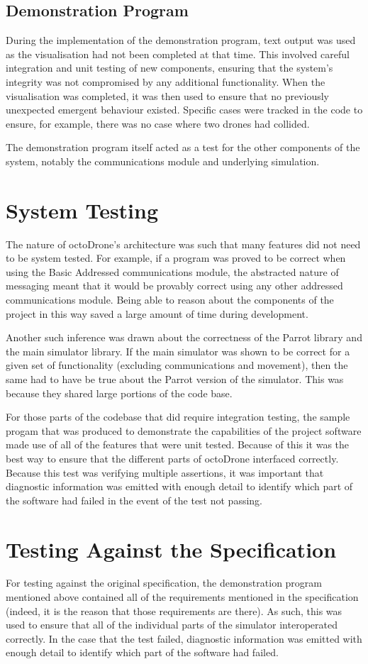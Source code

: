 \subsection{Demonstration Program}

During the implementation of the demonstration program, text output was used as the visualisation had not been completed at that time. This involved careful integration and unit testing of new components, ensuring that the system's integrity was not compromised by any additional functionality. When the visualisation was completed, it was then used to ensure that no previously unexpected emergent behaviour existed. Specific cases were tracked in the code to ensure, for example, there was no case where two drones had collided.

The demonstration program itself acted as a test for the other components of the system, notably the communications module and underlying simulation.


\section{System Testing}
The nature of octoDrone's architecture was such that many features did not need to be system tested. For example, if a program was proved to be correct when using the Basic Addressed communications module, the abstracted nature of messaging meant that it would be provably correct using any other addressed communications module. Being able to reason about the components of the project in this way saved a large amount of time during development.

Another such inference was drawn about the correctness of the Parrot library and the main simulator library. If the main simulator was shown to be correct for a given set of functionality (excluding communications and movement), then the same had to have be true about the Parrot version of the simulator. This was because they shared large portions of the code base.

For those parts of the codebase that did require integration testing, the sample progam that was produced to demonstrate the capabilities of the project software made use of all of the features that were unit tested. Because of this it was the best way to ensure that the different parts of octoDrone interfaced correctly. Because this test was verifying multiple assertions, it was important that diagnostic information was emitted with enough detail to identify which part of the software had failed in the event of the test not passing.

\section{Testing Against the Specification}
For testing against the original specification, the demonstration program mentioned above contained all of the requirements mentioned in the specification (indeed, it is the reason that those requirements are there). As such, this was used to ensure that all of the individual parts of the simulator interoperated correctly. In the case that the test failed, diagnostic information was emitted with enough detail to identify which part of the software had failed.
